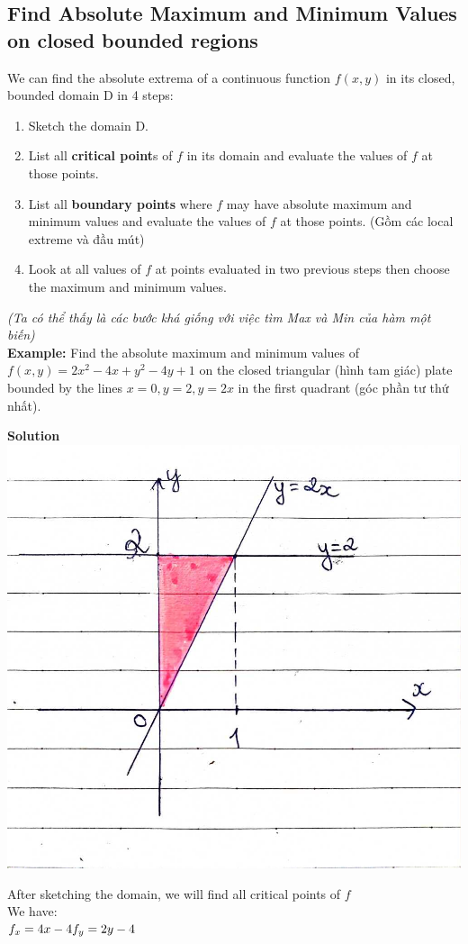 \documentclass{article}
\begin{document}
\subsection{Find Absolute Maximum and Minimum Values on closed bounded regions}   
\begin{mybox}
We can find the absolute extrema of a continuous function $f(x,y)$ in its closed, bounded domain D in 4 steps:
\begin{enumerate}
    \item Sketch the domain D.
    \item List all \textbf{critical point}s of $f$ in its domain and evaluate the values of $f$ at those points.
    \item List all \textbf{boundary points} where $f$ may have absolute maximum and minimum values and evaluate the values of $f$ at those points. (Gồm các local extreme và đầu mút)
    \item Look at all values of $f$ at points evaluated in two previous steps then choose the maximum and minimum values.
\end{enumerate}
\end{mybox}
\textit{(Ta có thể thấy là các bước khá giống với việc tìm Max và Min của hàm một biến)}\\
\textbf{Example:} Find the absolute maximum and minimum values of $f(x,y)=2x^2-4x+y^2-4y+1$ on the closed triangular (hình tam giác) plate bounded by the lines $x=0,y=2,y=2x$ in the first quadrant (góc phần tư thứ nhất).
\begin{center}
    \textbf{Solution}\\
    \includegraphics[width=0.5\linewidth]{ex4-1.png}
\end{center}
After sketching the domain, we will find all critical points of $f$\\
We have:\\
$f_x=4x-4\\
f_y=2y-4$\\
\end{document}
